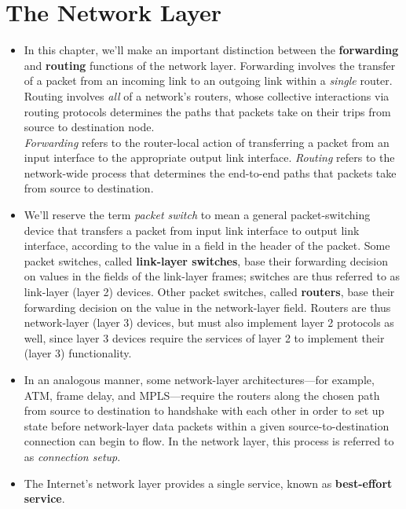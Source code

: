 \section{The Network Layer}
\begin{itemize}

\item
In this chapter, we'll make an important distinction between the \textbf{forwarding} and \textbf{routing} functions of the network layer. Forwarding involves the transfer of a packet from an incoming link to an outgoing link within a \textit{single} router. Routing involves \textit{all} of a network's routers, whose collective interactions via routing protocols determines the paths that packets take on their trips from source to destination node.\\
\textit{Forwarding} refers to the router-local action of transferring a packet from an input interface to the appropriate output link interface. \textit{Routing} refers to the network-wide process that determines the end-to-end paths that packets take from source to destination.

\item
We'll reserve the term \textit{packet switch} to mean a general packet-switching device that transfers a packet from input link interface to output link interface, according to the value in a field in the header of the packet. Some packet switches, called \textbf{link-layer switches}, base their forwarding decision on values in the fields of the link-layer frames; switches are thus referred to as link-layer (layer 2) devices. Other packet switches, called \textbf{routers}, base their forwarding decision on the value in the network-layer field. Routers are thus network-layer (layer 3) devices, but must also implement layer 2 protocols as well, since layer 3 devices require the services of layer 2 to implement their (layer 3) functionality.

\item
In an analogous manner, some network-layer architectures---for example, ATM, frame delay, and MPLS---require the routers along the chosen path from source to destination to handshake with each other in order to set up state before network-layer data packets within a given source-to-destination connection can begin to flow. In the network layer, this process is referred to as \textit{connection setup}.

\item
The Internet's network layer provides a single service, known as \textbf{best-effort service}.


\end{itemize}
